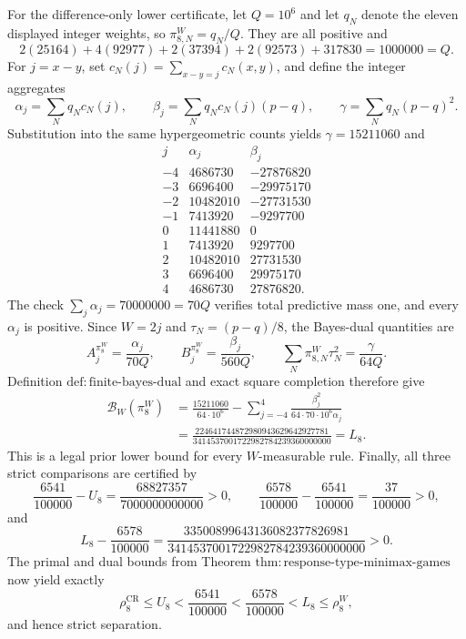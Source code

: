 For the difference-only lower certificate, let \(Q=10^6\) and let \(q_N\) denote the eleven displayed integer weights, so \(\pi_{8,N}^W=q_N/Q\).  They are all positive and
\[
 2(25164)+4(92977)+2(37394)+2(92573)+317830=1000000=Q.
\]
For \(j=x-y\), set \(c_N(j)=\sum_{x-y=j}c_N(x,y)\), and define the integer aggregates
\[
 \alpha_j=\sum_Nq_Nc_N(j),\qquad
 \beta_j=\sum_Nq_Nc_N(j)(p-q),\qquad
 \gamma=\sum_Nq_N(p-q)^2.
\]
Substitution into the same hypergeometric counts yields \(\gamma=15211060\) and
\[
\begin{array}{c|r|r}
j&\alpha_j&\beta_j\\ \hline
-4&4686730&-27876820\\
-3&6696400&-29975170\\
-2&10482010&-27731530\\
-1&7413920&-9297700\\
0&11441880&0\\
1&7413920&9297700\\
2&10482010&27731530\\
3&6696400&29975170\\
4&4686730&27876820.
\end{array}
\]
The check \(\sum_j\alpha_j=70000000=70Q\) verifies total predictive mass one, and every \(\alpha_j\) is positive.  Since \(W=2j\) and \(\tau_N=(p-q)/8\), the Bayes-dual quantities are
\[
 A_j^{\pi_8^W}=\frac{\alpha_j}{70Q},\qquad
 B_j^{\pi_8^W}=\frac{\beta_j}{560Q},\qquad
 \sum_N\pi_{8,N}^W\tau_N^2=\frac{\gamma}{64Q}.
\]
Definition \(\mathrm{def{:}finite\mbox{-}bayes\mbox{-}dual}\) and exact square completion therefore give
\[
 \begin{aligned}
 \mathcal B_W(\pi_8^W)
 &=\frac{15211060}{64\cdot10^6}
   -\sum_{j=-4}^4\frac{\beta_j^2}{64\cdot70\cdot10^6\alpha_j}\\
 &=\frac{224641744872980943629642927781}
 {3414537001722982784239360000000}=L_8.
 \end{aligned}
\]
This is a legal prior lower bound for every \(W\)-measurable rule.  Finally, all three strict comparisons are certified by
\[
 \frac{6541}{100000}-U_8
 =\frac{68827357}{7000000000000}>0,
 \qquad
 \frac{6578}{100000}-\frac{6541}{100000}=\frac{37}{100000}>0,
\]
and
\[
 L_8-\frac{6578}{100000}
 =\frac{33500899643136082377826981}
 {3414537001722982784239360000000}>0.
\]
The primal and dual bounds from Theorem \(\mathrm{thm{:}response\mbox{-}type\mbox{-}minimax\mbox{-}games}\) now yield exactly
\[
 \rho_8^{\mathrm{CR}}\leq U_8<\frac{6541}{100000}
 <\frac{6578}{100000}<L_8\leq\rho_8^W,
\]
and hence strict separation.

